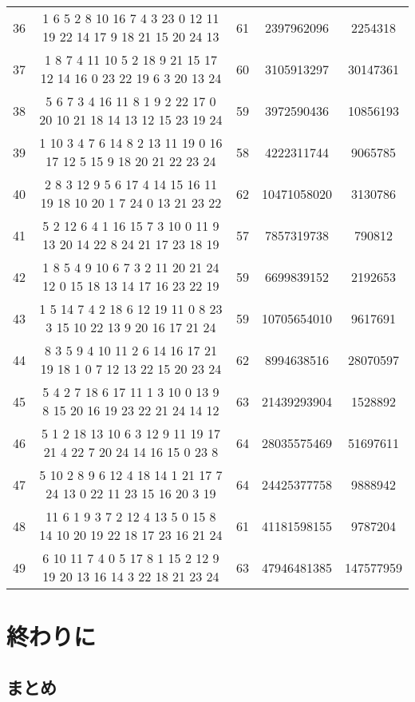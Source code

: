 \documentclass[a4paper,11pt,oneside,openany]{jsbook}
\begin{document}
\begin{table}[]
\begin{tabular}{|c|c|c|c|c|}
36 & 1 6 5 2 8 10 16 7 4 3 23 0 12 11 19 22 14 17 9 18 21 15 20 24 13  & 61 & 2397962096 & 2254318 \\
37 & 1 8 7 4 11 10 5 2 18 9 21 15 17 12 14 16 0 23 22 19 6 3 20 13 24  & 60 & 3105913297 & 30147361 \\
38 & 5 6 7 3 4 16 11 8 1 9 2 22 17 0 20 10 21 18 14 13 12 15 23 19 24  & 59 & 3972590436 & 10856193 \\
39 & 1 10 3 4 7 6 14 8 2 13 11 19 0 16 17 12 5 15 9 18 20 21 22 23 24  & 58 & 4222311744 & 9065785 \\
40 & 2 8 3 12 9 5 6 17 4 14 15 16 11 19 18 10 20 1 7 24 0 13 21 23 22  & 62 & 10471058020 & 3130786 \\
41 & 5 2 12 6 4 1 16 15 7 3 10 0 11 9 13 20 14 22 8 24 21 17 23 18 19  & 57 & 7857319738 & 790812 \\
42 & 1 8 5 4 9 10 6 7 3 2 11 20 21 24 12 0 15 18 13 14 17 16 23 22 19  & 59 & 6699839152 & 2192653 \\
43 & 1 5 14 7 4 2 18 6 12 19 11 0 8 23 3 15 10 22 13 9 20 16 17 21 24  & 59 & 10705654010 & 9617691 \\
44 & 8 3 5 9 4 10 11 2 6 14 16 17 21 19 18 1 0 7 12 13 22 15 20 23 24  & 62 & 8994638516 & 28070597 \\
45 & 5 4 2 7 18 6 17 11 1 3 10 0 13 9 8 15 20 16 19 23 22 21 24 14 12  & 63 & 21439293904 & 1528892 \\
46 & 5 1 2 18 13 10 6 3 12 9 11 19 17 21 4 22 7 20 24 14 16 15 0 23 8  & 64 & 28035575469 & 51697611 \\
47 & 5 10 2 8 9 6 12 4 18 14 1 21 17 7 24 13 0 22 11 23 15 16 20 3 19  & 64 & 24425377758 & 9888942 \\
48 & 11 6 1 9 3 7 2 12 4 13 5 0 15 8 14 10 20 19 22 18 17 23 16 21 24  & 61 & 41181598155 & 9787204 \\
49 & 6 10 11 7 4 0 5 17 8 1 15 2 12 9 19 20 13 16 14 3 22 18 21 23 24  & 63 & 47946481385 & 147577959 \\ \hline
\end{tabular}
\end{table}
\chapter{終わりに}
\section{まとめ}
\end{document}
